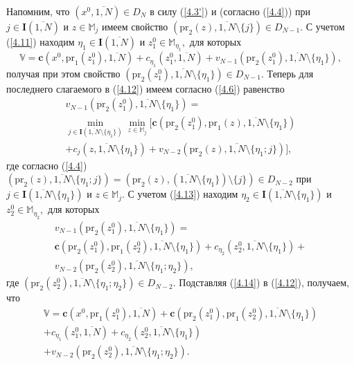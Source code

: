 \documentclass[10pt]{SPIIRAS_Proceedings}
\begin{document}
Напомним, что
$(x^0,\overline{1,N}) \in D_N$
в силу (\ref{4.3'}) и (согласно (\ref{4.4})) при
$j \in \mathbf{I}(\overline{1,N})$
и
$z \in \mathbb{M}_j$
имеем свойство
$(\mathrm{pr}_2(z),\overline{1,N} \setminus \{j\}) \in D_{N-1}.$
С учетом (\ref{4.11}) находим
$\eta_1 \in \mathbf{I}(\overline{1,N})$ и $z_1^0 \in \mathbb{M}_{\eta_1},$
для которых
\begin{equation}\label{4.12}
  \mathbb{V} = \mathbf{c}(x^0,\mathrm{pr}_1(z_1^0),\overline{1,N}) +
  c_{\eta_1}(z_1^0,\overline{1,N}) +
  v_{N-1}(\mathrm{pr}_2(z_1^0),\overline{1,N} \setminus \{\eta_1\}),
\end{equation}
получая при этом свойство
$(\mathrm{pr}_2(z_1^0),\overline{1,N} \setminus \{\eta_1\}) \in D_{N-1}.$
Теперь для последнего слагаемого в (\ref{4.12}) имеем согласно (\ref{4.6}) равенство
\begin{multline}
  \label{4.13}
  v_{N-1}(\mathrm{pr}_2(z_1^0),\overline{1,N}  \setminus \{\eta_1\}) =
  \\
  \min\limits_{j \in \mathbf{I}(\overline{1,N} \setminus \{\eta_1\})}
  \min\limits_{z \in \mathbb{M}_j}
  \big [
    \mathbf{c}(\mathrm{pr}_2(z_1^0),\mathrm{pr}_1(z),\overline{1,N} \setminus \{\eta_1\})
    \\
    + c_j(z,\overline{1,N} \setminus \{\eta_1\}) +
    v_{N-2}(\mathrm{pr}_2(z),\overline{1,N} \setminus \{\eta_1;j\})
  \big ],
\end{multline}
где согласно (\ref{4.4})
$(\mathrm{pr}_2(z),\overline{1,N} \setminus \{\eta_1;j\}) =
(\mathrm{pr}_2(z),(\overline{1,N} \setminus \{\eta_1\}) \setminus \{j\}) \in D_{N-2}$
при
$j \in \mathbf{I}(\overline{1,N} \setminus \{\eta_1\})$ и $z \in \mathbb{M}_j.$
С учетом (\ref{4.13}) находим
$\eta_2 \in \mathbf{I}(\overline{1,N} \setminus \{\eta_1\})$ и $z_2^0 \in \mathbb{M}_{\eta_2},$
для которых
\begin{multline}
  \label{4.14}
  v_{N-1}(\mathrm{pr}_2(z_1^0),\overline{1,N} \setminus \{\eta_1\}) =
  \\
  \mathbf{c}(\mathrm{pr}_2(z_1^0),\mathrm{pr}_1(z_2^0),\overline{1,N}
  \setminus \{\eta_1\}) + c_{\eta_2}(z_2^0,\overline{1,N}
  \setminus \{\eta_1\})
  + \\
  v_{N-2}(\mathrm{pr}_2(z_2^0),\overline{1,N} \setminus
  \{\eta_1;\eta_2\}),
\end{multline}
где
$(\mathrm{pr}_2(z_2^0),\overline{1,N} \setminus \{\eta_1;\eta_2\}) \in D_{N-2}.$
Подставляя (\ref{4.14}) в (\ref{4.12}), получаем, что
\begin{equation}\label{4.15}
  \begin{array}{c}
    \mathbb{V} =
    \mathbf{c}(x^0,\mathrm{pr}_1(z_1^0),\overline{1,N}) +
    \mathbf{c}(\mathrm{pr}_2(z_1^0),\mathrm{pr}_1(z_2^0),\overline{1,N} \setminus \{\eta_1\})\\
    + c_{\eta_1}(z_1^0,\overline{1,N}) + c_{\eta_2}(z_2^0,\overline{1,N} \setminus \{\eta_1\})
    \\
    + v_{N-2}(\mathrm{pr}_2(z_2^0),\overline{1,N} \setminus \{\eta_1;\eta_2\}).
  \end{array}
\end{equation}
\end{document}
